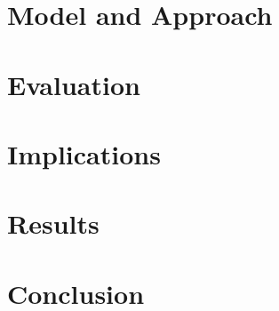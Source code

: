 \documentclass[twoside,twocolumn]{article}
\begin{document}

\section{Model and Approach}

\section{Evaluation}

\section{Implications}

\section{Results}



\section{Conclusion}






\printbibliography

  

\end{document}
